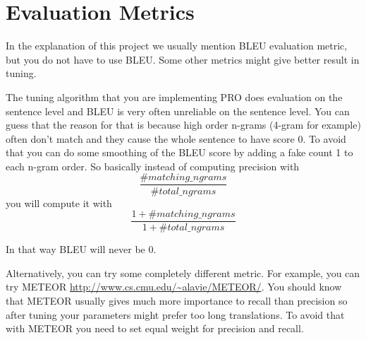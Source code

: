 \section{Evaluation Metrics }

In the explanation of this project we usually mention BLEU evaluation metric, but you do not have to use BLEU. Some other metrics might give better result in tuning.

The tuning algorithm that you are implementing PRO does evaluation on the sentence level and BLEU is very often unreliable on the sentence level. You can guess that the reason for that is because high order n-grams (4-gram for example) often don't match and they cause the whole sentence to have score $0$. To avoid that you can do some smoothing of the BLEU score by adding a fake count 1 to each n-gram order. So basically instead of computing precision with 
\begin{equation}
    \frac{\#matching\_ngrams}{\#total\_ngrams}
\end{equation}
you will compute it with
\begin{equation}
    \frac{1+\#matching\_ngrams}{1+\#total\_ngrams}
\end{equation}

In that way BLEU will never be 0.

Alternatively, you can try some completely different metric. For example, you can try METEOR \url{http://www.cs.cmu.edu/~alavie/METEOR/}. You should know that METEOR usually gives much more importance to recall than precision so after tuning your parameters might prefer too long translations. To avoid that with METEOR you need to set equal weight for precision and recall.
